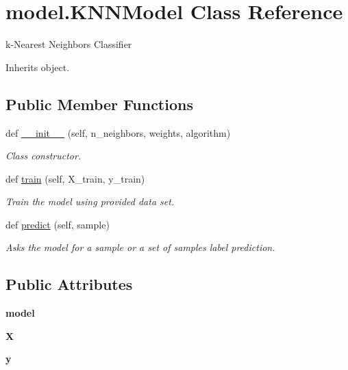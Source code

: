 \hypertarget{classmodel_1_1_k_n_n_model}{}\section{model.\+K\+N\+N\+Model Class Reference}
\label{classmodel_1_1_k_n_n_model}


k-\/\+Nearest Neighbors Classifier  




Inherits object.

\subsection*{Public Member Functions}
\begin{DoxyCompactItemize}
\item 
def \mbox{\hyperlink{classmodel_1_1_k_n_n_model_adf9dfe4873a42c286cf74ce993eb9cc5}{\+\_\+\+\_\+init\+\_\+\+\_\+}} (self, n\+\_\+neighbors, weights, algorithm)
\begin{DoxyCompactList}\small\item\em Class constructor. \end{DoxyCompactList}\item 
def \mbox{\hyperlink{classmodel_1_1_k_n_n_model_aa81d72d9267f8a9cac3e2ec969fdf2a2}{train}} (self, X\+\_\+train, y\+\_\+train)
\begin{DoxyCompactList}\small\item\em Train the model using provided data set. \end{DoxyCompactList}\item 
\mbox{\label{classmodel_1_1_k_n_n_model_adeac50179fc49d32b0a09ffa561dfc98}} 
def \mbox{\hyperlink{classmodel_1_1_k_n_n_model_adeac50179fc49d32b0a09ffa561dfc98}{predict}} (self, sample)
\begin{DoxyCompactList}\small\item\em Asks the model for a sample or a set of samples label prediction. \end{DoxyCompactList}\end{DoxyCompactItemize}
\subsection*{Public Attributes}
\begin{DoxyCompactItemize}
\item 
\mbox{\label{classmodel_1_1_k_n_n_model_a6cf5b3b338ca80df0dfbf27c76d569da}} 
{\bfseries model}
\item 
\mbox{\label{classmodel_1_1_k_n_n_model_ac1f7974ec311cba1666ce6f7d20b3b57}} 
{\bfseries X}
\item 
\mbox{\label{classmodel_1_1_k_n_n_model_a1e3f2fb75c9d96f7a86e53c4196ad4ec}} 
{\bfseries y}
\end{DoxyCompactItemize}


